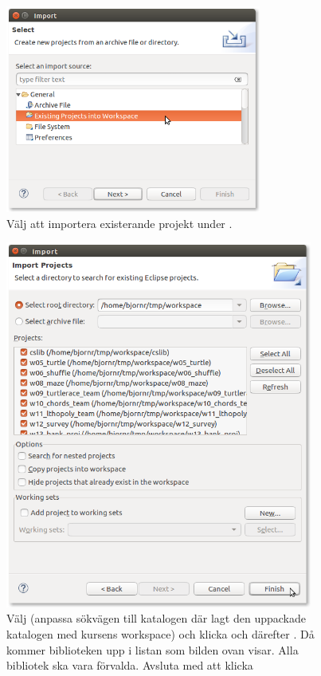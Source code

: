 \begin{enumerate}
\begin{figure}[H]
\centering
\includegraphics[width=0.75\textwidth]{../img/eclipse/eclipse-import-existing.png}
\caption {Välj att importera existerande projekt under .}
\label{fig:eclipse:import-existing}
\end{figure}


\begin{figure}[H]
\centering
\includegraphics[width=0.9\textwidth]{../img/eclipse/eclipse-import-projects.png}
\caption {Välj  (anpassa sökvägen till katalogen där lagt den uppackade katalogen med kursens workspace) och klicka  och därefter . Då kommer biblioteken upp i listan som bilden ovan visar. Alla bibliotek ska vara förvalda. Avsluta med att klicka }
\label{fig:eclipse:import-projects}
\end{figure}



\end{enumerate}
